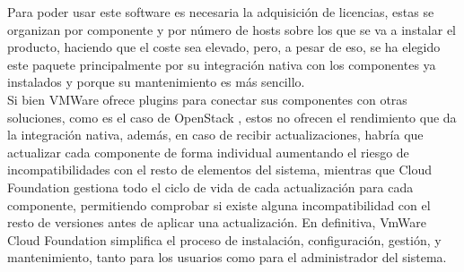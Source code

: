 Para poder usar este software es necesaria la adquisición de licencias, estas se organizan por componente y por número de hosts sobre los que se va a instalar el producto, haciendo que el coste sea elevado, pero, a pesar de eso, se ha elegido este paquete principalmente por su integración nativa con los componentes ya instalados y porque su mantenimiento es más sencillo. \\
Si bien VMWare ofrece plugins para conectar sus componentes con otras soluciones, como es el caso de OpenStack \cite{opestackintegrated}, estos no ofrecen el rendimiento que da la integración nativa, además, en caso de recibir actualizaciones, habría que actualizar cada componente de forma individual aumentando el riesgo de incompatibilidades con el resto de elementos del sistema, mientras que Cloud Foundation gestiona todo el ciclo de vida de cada actualización para cada componente, permitiendo comprobar si existe alguna incompatibilidad con el resto de versiones antes de aplicar una actualización. En definitiva, VmWare Cloud Foundation simplifica el proceso de instalación, configuración, gestión, y mantenimiento, tanto para los usuarios como para el administrador del sistema.

